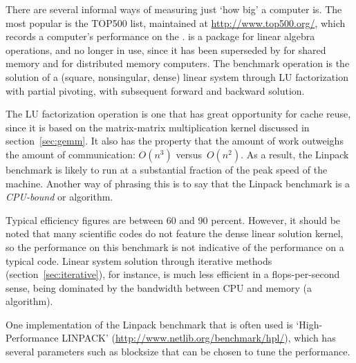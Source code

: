 
There are several informal ways of measuring just `how big' a computer
is. The most popular is the TOP500 list, maintained at
\url{http://www.top500.org/}, which records a computer's performance
on the .  is a
package for linear algebra operations, and no longer in use, since it
has been superseded by  for shared memory and
 for distributed memory computers. The benchmark
operation is the solution of a (square, nonsingular, dense) linear
system through LU factorization with partial pivoting, with subsequent
forward and backward solution.

The LU factorization operation is one that has great opportunity for
cache reuse, since it is based on the matrix-matrix multiplication
kernel discussed in section~\ref{sec:gemm}. It also has the property
that the amount of work outweighs the amount of communication:
$O(n^3)$ versus~$O(n^2)$.  As a result, the Linpack benchmark is
likely to run at a substantial fraction of the peak speed of the
machine. Another way of phrasing this is to say that the Linpack
benchmark is a \emph{CPU-bound} or 
algorithm.

Typical efficiency figures are between 60 and 90 percent. However, it
should be noted that many scientific codes do not feature the dense
linear solution kernel, so the performance on this benchmark is not
indicative of the performance on a typical code. Linear system
solution through iterative methods (section~\ref{sec:iterative}), for
instance, is much less efficient in a flops-per-second sense, being
dominated by the bandwidth between CPU and memory
(a~  algorithm).

One implementation of the Linpack benchmark that is often used is
`High-Performance LINPACK'
(\url{http://www.netlib.org/benchmark/hpl/}), which has several
parameters such as blocksize that can be chosen to tune the performance.

